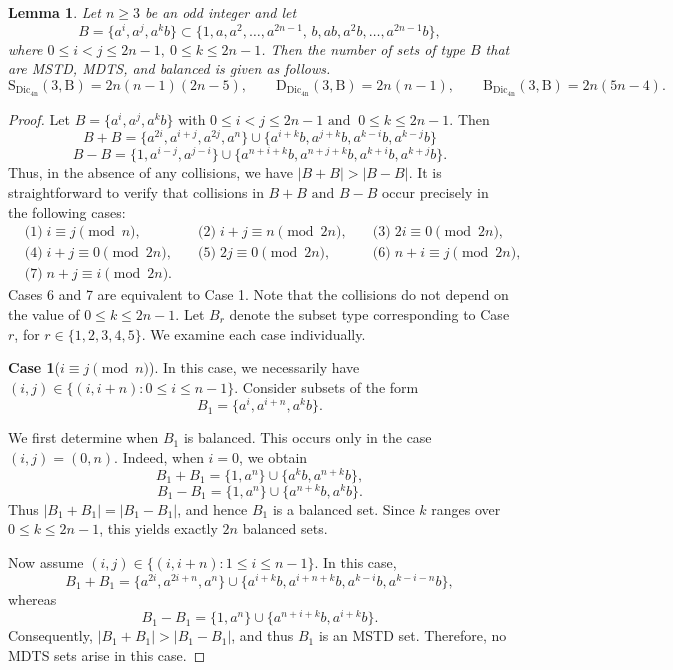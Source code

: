 \documentclass[11pt,reqno]{amsart}
\numberwithin{equation}{section}
\newtheorem{lemma}[theorem]{Lemma}
\begin{document}
\begin{lemma}\label{Lemma1.5}
Let $n\geq3$ be an odd integer and let 
$$B=\{a^i,a^j,a^kb\}\subset \{1,a,a^{2},\ldots,a^{2n-1},\, b,ab,a^{2}b,\ldots,a^{2n-1}b\},$$ where $0\leq i<j\leq 2n-1,~0\leq k\leq 2n-1$. Then the number of sets of type $B$ that are MSTD, MDTS, and balanced is given as follows.
$$\mathrm{S_{\mathrm{Dic_{4n}}}(3,B)}=2n(n-1)(2n-5),\qquad\mathrm{D_{\mathrm{Dic_{4n}}}(3,B)}=2n(n-1),\qquad\mathrm{B_{\mathrm{Dic_{4n}}}(3,B)}=2n(5n-4).$$
\end{lemma}
\begin{proof}
Let $B=\{a^i,a^j,a^kb\}$ with $0\leq i<j\leq 2n-1 \text{ and }~0\leq k\leq 2n-1$. Then 
$$B+B=\{a^{2i},a^{i+j},a^{2j},a^n\}\cup\{a^{i+k}b,a^{j+k}b,a^{k-i}b,a^{k-j}b\}$$  
$$B-B=\{1,a^{i-j},a^{j-i}\}\cup \{a^{n+i+k}b,a^{n+j+k}b,a^{k+i}b,a^{k+j}b\}.$$ 
Thus, in the absence of any collisions, we have $|B+B|>|B-B|$.
It is straightforward to verify that collisions in $B+B \text{ and }B-B$ occur precisely in the following cases:
\begin{align*}
&\text{(1)}\; i \equiv j \pmod{n}, \quad
&\text{(2)}\; i+j \equiv n \pmod{2n}, \quad
&\text{(3)}\; 2i \equiv 0 \pmod{2n},\\
&\text{(4)}\; i+j \equiv 0 \pmod{2n}, \quad
&\text{(5)}\; 2j \equiv 0 \pmod{2n}, \quad
&\text{(6)}\; n+i \equiv j \pmod{2n},\\
&\text{(7)}\; n+j \equiv i \pmod{2n}.
\end{align*}
Cases 6 and 7 are equivalent to Case 1. Note that the collisions do not depend on the value of $0\leq k\leq 2n-1$. Let $B_{r}$ denote the subset type corresponding to Case $r$, for $r\in \{1,2,3,4,5\}$.   We examine each case individually.\par
\textbf{Case 1}($i \equiv j \pmod n$).
In this case, we necessarily have $(i,j)\in \{(i,i+n): 0\leq i\leq n-1\}$. Consider subsets of the form
$$B_1=\{a^{i},a^{i+n},a^{k}b\}.$$

We first determine when $B_1$ is balanced. This occurs only in the case $(i,j)=(0,n)$. Indeed, when $i=0$, we obtain
$$B_1+B_1=\{1,a^{n}\}\cup\{a^{k}b,a^{n+k}b\},$$
$$B_1-B_1=\{1,a^{n}\}\cup\{a^{n+k}b,a^{k}b\}.$$
Thus $|B_1+B_1|=|B_1-B_1|$, and hence $B_1$ is a balanced set. Since $k$ ranges over $0\le k\le 2n-1$, this yields exactly $2n$ balanced sets.

Now assume $(i,j)\in \{(i,i+n): 1\leq i\leq n-1\}$. In this case,
$$B_1+B_1=\{a^{2i},a^{2i+n},a^{n}\}\cup\{a^{i+k}b,a^{i+n+k}b,a^{k-i}b,a^{k-i-n}b\},$$
whereas
$$B_1-B_1=\{1,a^{n}\}\cup\{a^{n+i+k}b,a^{i+k}b\}.
$$
Consequently, $|B_1+B_1|>|B_1-B_1|$, and thus $B_1$ is an MSTD set. Therefore, no MDTS sets arise in this case.


\end{proof}
\end{document}
